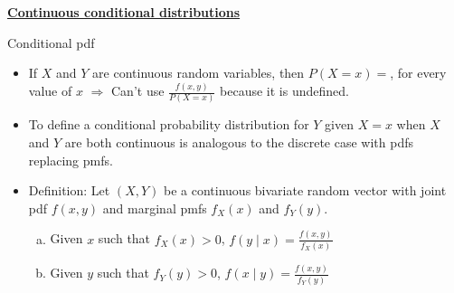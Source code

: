 \documentclass{article}
\newcommand{\bu}[1]{\textbf{\ul{#1}}}				%
\begin{document}
\bu{Continuous conditional distributions}\bigskip

Conditional pdf\bigskip
\begin{itemize}
    \item If $X$ and $Y$ are continuous random variables, then $P(X = x) =$\hspace{6pt}, for every value of $x$ $\Longrightarrow$ Can't use $\displaystyle \frac{f(x,y)}{P(X = x)}$ because it is undefined.
    \item[] To define a conditional probability distribution for $Y$ given $X = x$ when  $X$ and $Y$ are both continuous is analogous to the discrete case with pdfs replacing pmfs.\bigskip
    \item Definition: Let $(X,Y)$ be a continuous bivariate random vector with joint pdf $f(x,y)$ and marginal pmfs $f_X(x)$ and $f_Y(y)$.
    \begin{enumerate}[(a)]
        \item Given $x$ such that $f_X(x) > 0$, \hspace{20pt} $\displaystyle f(y \mid x) = \frac{f(x,y)}{f_X(x)}$
        \item Given $y$ such that $f_Y(y) > 0$, \hspace{20pt}  $\displaystyle f(x \mid y) = \frac{f(x,y)}{f_Y(y)}$
    \end{enumerate}
\end{itemize}\bigskip

\newpage
\end{document}
